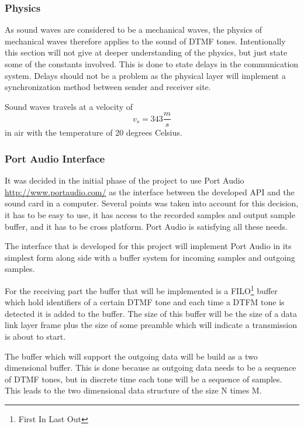 		\subsubsection{Physics}
		As sound waves are considered to be a mechanical waves, the physics of mechanical waves therefore
		applies to the sound of DTMF tones. Intentionally this section will not give at deeper understanding
		of the physics, but just state some of the constants involved. This is done to state delays in the
		communication system. Delays should not be a problem as the physical layer will implement a
		synchronization method between sender and receiver site.
		
		Sound waves travels at a velocity of
		\begin{equation}v_{s} = 343 \frac{m}{s}\end{equation}
		in air with the temperature of 20 degrees Celsius.
		
		\subsubsection{Port Audio Interface}
		It was decided in the initial phase of the project to use Port Audio \url{http://www.portaudio.com/}
		as the interface between the developed API and the sound card in a computer. Several points
		was taken into account for this decision, it has to be easy to use, it has access to the recorded
		samples and output sample buffer, and it has to be cross platform. Port Audio is satisfying all these needs.

		The interface that is developed for this project will implement Port Audio in its simplest
		form along side with a buffer system for incoming samples and outgoing samples.
		
		For the receiving part the buffer that will be implemented is a FILO\footnote{First In Last Out}
		buffer which hold identifiers of a certain DTMF tone and each time a DTFM tone is detected it is added
		to the buffer. The size of this buffer will be the size of a data link layer frame plus the size of some
		preamble which will indicate a transmission is about to start.
		
		The buffer which will support the outgoing data will be build as a two dimensional buffer. This
		is done because as outgoing data needs to be a sequence of DTMF tones, but in discrete time each
		tone will be a sequence of samples. This leads to the two dimensional data structure of the size N times M.
		
